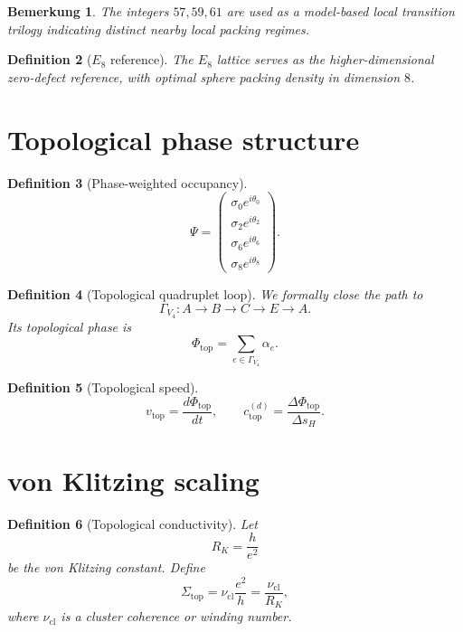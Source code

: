 \documentclass[11pt,a4paper]{article}
\newtheorem{definition}{Definition}[section]
\newtheorem{bemerkung}[definition]{Bemerkung}
\begin{document}
	\begin{bemerkung}
		The integers $57,59,61$ are used as a model-based local transition trilogy indicating distinct nearby local packing regimes.
	\end{bemerkung}
	
	\begin{definition}[$E_8$ reference]
		The $E_8$ lattice serves as the higher-dimensional zero-defect reference, with optimal sphere packing density in dimension $8$.
	\end{definition}
	
	\section{Topological phase structure}
	
	\begin{definition}[Phase-weighted occupancy]
		\[
		\Psi=
		\begin{pmatrix}
			\sigma_0 e^{i\theta_0}\\
			\sigma_2 e^{i\theta_2}\\
			\sigma_6 e^{i\theta_6}\\
			\sigma_8 e^{i\theta_8}
		\end{pmatrix}.
		\]
	\end{definition}
	
	\begin{definition}[Topological quadruplet loop]
		We formally close the path to
		\[
		\Gamma_{V_4}:A\to B\to C\to E\to A.
		\]
		Its topological phase is
		\[
		\Phi_{\mathrm{top}}=\sum_{e\in\Gamma_{V_4}}\alpha_e.
		\]
	\end{definition}
	
	\begin{definition}[Topological speed]
		\[
		v_{\mathrm{top}}=\frac{d\Phi_{\mathrm{top}}}{dt},
		\qquad
		c_{\mathrm{top}}^{(d)}=\frac{\Delta\Phi_{\mathrm{top}}}{\Delta s_H}.
		\]
	\end{definition}
	
	\section{von Klitzing scaling}
	
	\begin{definition}[Topological conductivity]
		Let
		\[
		R_K=\frac{h}{e^2}
		\]
		be the von Klitzing constant. Define
		\[
		\Sigma_{\mathrm{top}}=\nu_{\mathrm{cl}}\frac{e^2}{h}
		=\frac{\nu_{\mathrm{cl}}}{R_K},
		\]
		where $\nu_{\mathrm{cl}}$ is a cluster coherence or winding number.
	\end{definition}
	
\end{document}

